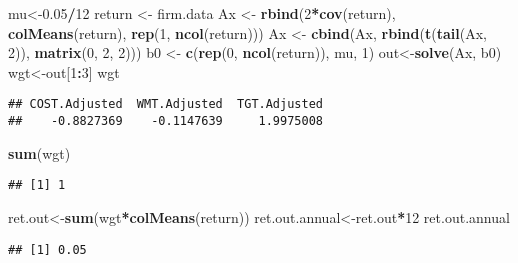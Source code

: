 \documentclass[]{article}
\newenvironment{Shaded}{\begin{snugshade}}{\end{snugshade}}
\newcommand{\DecValTok}[1]{\textcolor[rgb]{0.00,0.00,0.81}{#1}}
\newcommand{\FloatTok}[1]{\textcolor[rgb]{0.00,0.00,0.81}{#1}}
\newcommand{\KeywordTok}[1]{\textcolor[rgb]{0.13,0.29,0.53}{\textbf{#1}}}
\newcommand{\NormalTok}[1]{#1}
\newcommand{\OperatorTok}[1]{\textcolor[rgb]{0.81,0.36,0.00}{\textbf{#1}}}
\newcommand{\StringTok}[1]{\textcolor[rgb]{0.31,0.60,0.02}{#1}}
\begin{document}
\begin{Shaded}
\begin{Highlighting}[]
\NormalTok{mu<-}\FloatTok{0.05}\OperatorTok{/}\DecValTok{12}
\NormalTok{return <-}\StringTok{ }\NormalTok{firm.data}
\NormalTok{Ax <-}\StringTok{ }\KeywordTok{rbind}\NormalTok{(}\DecValTok{2}\OperatorTok{*}\KeywordTok{cov}\NormalTok{(return), }\KeywordTok{colMeans}\NormalTok{(return), }\KeywordTok{rep}\NormalTok{(}\DecValTok{1}\NormalTok{, }\KeywordTok{ncol}\NormalTok{(return)))}
\NormalTok{Ax <-}\StringTok{ }\KeywordTok{cbind}\NormalTok{(Ax, }\KeywordTok{rbind}\NormalTok{(}\KeywordTok{t}\NormalTok{(}\KeywordTok{tail}\NormalTok{(Ax, }\DecValTok{2}\NormalTok{)), }\KeywordTok{matrix}\NormalTok{(}\DecValTok{0}\NormalTok{, }\DecValTok{2}\NormalTok{, }\DecValTok{2}\NormalTok{)))}
\NormalTok{b0 <-}\StringTok{ }\KeywordTok{c}\NormalTok{(}\KeywordTok{rep}\NormalTok{(}\DecValTok{0}\NormalTok{, }\KeywordTok{ncol}\NormalTok{(return)), mu, }\DecValTok{1}\NormalTok{)}
\NormalTok{out<-}\KeywordTok{solve}\NormalTok{(Ax, b0)}
\NormalTok{wgt<-out[}\DecValTok{1}\OperatorTok{:}\DecValTok{3}\NormalTok{]}
\NormalTok{wgt}
\end{Highlighting}
\end{Shaded}

\begin{verbatim}
## COST.Adjusted  WMT.Adjusted  TGT.Adjusted 
##    -0.8827369    -0.1147639     1.9975008
\end{verbatim}

\begin{Shaded}
\begin{Highlighting}[]
\KeywordTok{sum}\NormalTok{(wgt)}
\end{Highlighting}
\end{Shaded}

\begin{verbatim}
## [1] 1
\end{verbatim}

\begin{Shaded}
\begin{Highlighting}[]
\NormalTok{ret.out<-}\KeywordTok{sum}\NormalTok{(wgt}\OperatorTok{*}\KeywordTok{colMeans}\NormalTok{(return))}
\NormalTok{ret.out.annual<-ret.out}\OperatorTok{*}\DecValTok{12}
\NormalTok{ret.out.annual}
\end{Highlighting}
\end{Shaded}

\begin{verbatim}
## [1] 0.05
\end{verbatim}
\end{document}
